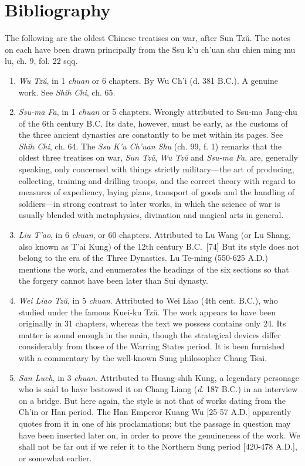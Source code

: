 \documentclass[10pt,a4paper]{book}
\begin{document}
\chapter*{Bibliography}
The following are the oldest Chinese treatises on war, after Sun Tzŭ. The notes on each have been drawn principally from the Ssu k’u ch’uan shu chien ming mu lu, ch. 9, fol. 22 sqq. 
\begin{enumerate}[label=\arabic*., leftmargin=*, labelsep=1em, itemsep=1em, align=left, nosep, wide=0pt]
    \item \textit{Wu Tzŭ}, in 1 \textit{chuan} or 6 chapters. By Wu Ch’i (d. 381 B.C.). A genuine work. See \textit{Shih Chi}, ch. 65.
    \item \textit{Ssu-ma Fa}, in 1 \textit{chuan} or 5 chapters. Wrongly attributed to Ssu-ma Jang-chu of the 6th century B.C. Its date, however, must be early, as the customs of the three ancient dynasties are constantly to be met within its pages. See \textit{Shih Chi}, ch. 64.
    The \textit{Ssu K’u Ch’uan Shu} (ch. 99, f. 1) remarks that the oldest three treatises on war, \textit{Sun Tzŭ}, \textit{Wu Tzŭ} and \textit{Ssu-ma Fa}, are, generally speaking, only concerned with things strictly military—the art of producing, collecting, training and drilling troops, and the correct theory with regard to measures of expediency, laying plans, transport of goods and the handling of soldiers—in strong contrast to later works, in which the science of war is usually blended with metaphysics, divination and magical arts in general.
    \item \textit{Liu T’ao}, in 6 \textit{chuan}, or 60 chapters. Attributed to Lu Wang (or Lu Shang, also known as T’ai Kung) of the 12th century B.C.\ [74] But its style does not belong to the era of the Three Dynasties. Lu Te-ming (550-625 A.D.) mentions the work, and enumerates the headings of the six sections so that the forgery cannot have been later than Sui dynasty.
    \item \textit{Wei Liao Tzŭ}, in 5 \textit{chuan}. Attributed to Wei Liao (4th cent. B.C.), who studied under the famous Kuei-ku Tzŭ. The work appears to have been originally in 31 chapters, whereas the text we possess contains only 24. Its matter is sound enough in the main, though the strategical devices differ considerably from those of the Warring States period. It is been furnished with a commentary by the well-known Sung philosopher Chang Tsai. 
    \item \textit{San Lueh}, in 3 \textit{chuan}. Attributed to Huang-shih Kung, a legendary personage who is said to have bestowed it on Chang Liang (\textit{d}. 187 B.C.) in an interview on a bridge. But here again, the style is not that of works dating from the Ch’in or Han period. The Han Emperor Kuang Wu [25-57 A.D.] apparently quotes from it in one of his proclamations; but the passage in question may have been inserted later on, in order to prove the genuineness of the work. We shall not be far out if we refer it to the Northern Sung period [420-478 A.D.], or somewhat earlier. 

\end{enumerate}
\end{document}
